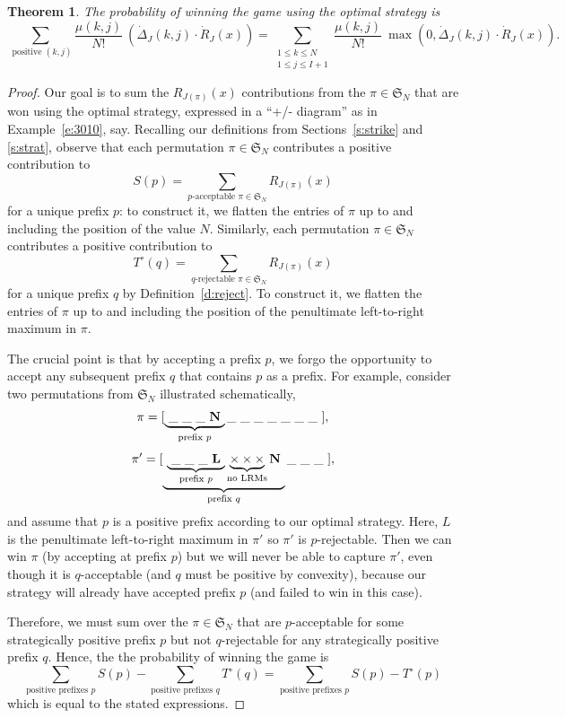 \documentclass[11pt]{amsart}   %
\newtheorem{theorem}{Theorem}[section]
\theoremstyle{definition}
\theoremstyle{remark}
\numberwithin{equation}{section}
\theoremstyle{theorem}
\renewcommand{\S}{\mathcal{S}}
\newcommand{\SN}{\mathfrak{S}}
\renewcommand{\S}{\mathfrak{S}}
\begin{document}
\begin{theorem}\label{t:themainp}
The probability of winning the game using the optimal strategy is 
\begin{equation}\label{e:mainprob_d}
 \sum_{\text{ positive } (k,j)} \frac{\mu(k,j)}{N!} \ \left( \dot\Delta_J(k, j) \cdot \dot{R}_J(x) \right) = \sum_{\substack{1 \leq k \leq N \\ 1 \leq j \leq I+1}} \frac{\mu(k,j)}{N!} \ \max\left( 0, \dot\Delta_J(k, j) \cdot \dot{R}_J(x) \right).
\end{equation}
\end{theorem}
\begin{proof}
Our goal is to sum the $R_{J(\pi)}(x)$ contributions from the $\pi \in \S_N$
that are won using the optimal strategy, expressed in a ``+/- diagram'' as in
Example~\ref{e:3010}, say.  Recalling our definitions from
Sections~\ref{s:strike} and \ref{s:strat}, observe that each permutation $\pi
\in \S_N$ contributes a positive contribution to 
\[ S(p) = \sum\limits_{p\text{-acceptable } \pi \in \SN_N}  R_{J(\pi)}(x) \]
for a unique prefix $p$:  to construct it, we flatten the entries of
$\pi$ up to and including the position of the value $N$.  Similarly, each
permutation $\pi \in \S_N$ contributes a positive contribution to 
\[ T^\circ(q) = \sum\limits_{q\text{-rejectable } \pi \in \SN_N}  R_{J(\pi)}(x) \]
for a unique prefix $q$ by Definition~\ref{d:reject}.  To construct it,
we flatten the entries of $\pi$ up to and including the position of the
penultimate left-to-right maximum in $\pi$.

The crucial point is that by accepting a prefix $p$, we forgo the opportunity
to accept any subsequent prefix $q$ that contains $p$ as a prefix.  For
example, consider two permutations from $\S_N$ illustrated schematically,
\[ \pi =  [\underbrace{\ \_\ \_\ \_\ {\bf N}\ }_{\text{prefix $p$}} \_\ \_\ \_\ \_\ \_\ \_\ \_\ ],  \]
\[ \pi' =  [\underbrace{\ \underbrace{\ \_\ \_\ \_\ {\bf L}\ }_{\text{prefix $p$}} \underbrace{\times \times \times}_{\text{no LRMs}} {\bf N}\ }_{\text{prefix $q$}} \_\ \_\ \_\ ],  \]
and assume that $p$ is a positive prefix according to our optimal strategy.
Here, $L$ is the penultimate left-to-right maximum in $\pi'$ so $\pi'$ is
$p$-rejectable.  Then we can win $\pi$ (by accepting at prefix $p$) but we will
never be able to capture $\pi'$, even though it is $q$-acceptable (and $q$ must
be positive by convexity), because our strategy will already have accepted
prefix $p$ (and failed to win in this case).

Therefore, we must sum over the $\pi \in \S_N$ that are $p$-acceptable for some
strategically positive prefix $p$ but not $q$-rejectable for any strategically
positive prefix $q$.  Hence, the the probability of winning the game is
\[ \sum\limits_{\text{positive prefixes $p$}} S(p) - \sum\limits_{\text{positive prefixes $q$}} T^\circ(q) = \sum\limits_{\text{positive prefixes $p$}} S(p) - T^\circ(p) \]
which is equal to the stated expressions.
\end{proof}
\end{document}
